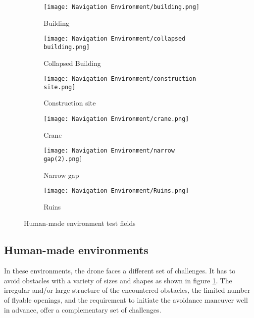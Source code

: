 \begin{figure}[!h]
	\centering
	\begin{subfigure}[b]{0.29\textwidth}
		\centering
		\texttt{[image: Navigation Environment/building.png]}
		\caption{Building}
	\end{subfigure}
	\hfill
	\begin{subfigure}[b]{0.29\textwidth}
		\centering
		\texttt{[image: Navigation Environment/collapsed building.png]}
		\caption{Collapsed Building}
	\end{subfigure}
	\hfill	
	\begin{subfigure}[b]{0.29\textwidth}
		\centering
		\texttt{[image: Navigation Environment/construction site.png]}
		\caption{Construction site}
	\end{subfigure}
	\hfill
	\begin{subfigure}[b]{0.29\textwidth}
		\centering
		\texttt{[image: Navigation Environment/crane.png]}
		\caption{Crane}
	\end{subfigure}
	\hfill
	\begin{subfigure}[b]{0.29\textwidth}
		\centering
		\texttt{[image: Navigation Environment/narrow gap(2).png]}
		\caption{Narrow gap}
	\end{subfigure}
	\hfill
	\begin{subfigure}[b]{0.29\textwidth}
		\centering
		\texttt{[image: Navigation Environment/Ruins.png]}
		\caption{Ruins}
	\end{subfigure}
	
	\caption{Human-made environment test fields}
	\label{fig:human envt}
\end{figure}


\subsection{Human-made environments}
In these environments, the drone
faces a different set of challenges. It has to avoid obstacles with
a variety of sizes and shapes as shown in figure \ref{fig:human envt}. The irregular
and/or large structure of the encountered obstacles, the limited number
of flyable openings, and the requirement to initiate the avoidance
maneuver well in advance, offer a complementary set of challenges.

